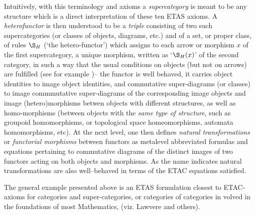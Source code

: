 \documentclass[12pt]{article}
\theoremstyle{plain}
\theoremstyle{definition}
\numberwithin{equation}{section}
\begin{document}
Intuitively, with this terminology and axioms a \textit{supercategory} is meant to be any structure which is a direct interpretation of these ten ETAS axioms. A \textit{heterofunctor} is then  understood to be a \textit{triple} consisting of two such supercategories (or classes of objects, diagrams, etc.) and of a set, or proper class,  of rules $\S_H$ (`the hetero-functor') which assigns to each arrow or morphism $x$ of the first supercategory,
a unique morphism, written as `$\S_H (x)$' of the second category, in such a way that the usual conditions on objects (but not on arrows) are fulfilled (see for example \cite {ICBM})--  the functor is well behaved, it carries object identities to image object identities, and commutative super-diagrams (or classes) to image commmutative super-diagrams of the corresponding image objects and image (hetero)morphisms betwen objects with different structures, as well as homo-morphisms (between objects with the {\em same type of structure}, such as groupoid homomorphisms, or topological space homeomorphisms, automata homomorphisms, etc).  At the next level, one then defines \emph{natural transformations} or \emph{functorial morphisms} between functors as metalevel abbreviated formulas and equations pertaining to commutative diagrams of the distinct images of two functors acting on both objects and morphisms. As the name indicates natural transformations are also well--behaved in terms of the ETAC equations satisfied. 

The general example presented above is an ETAS formulation closest to ETAC-axioms for categories and super-categories, or categories of categories in volved in the foundations of most Mathematics, (viz. Lawvere and others). 
\end{document}
